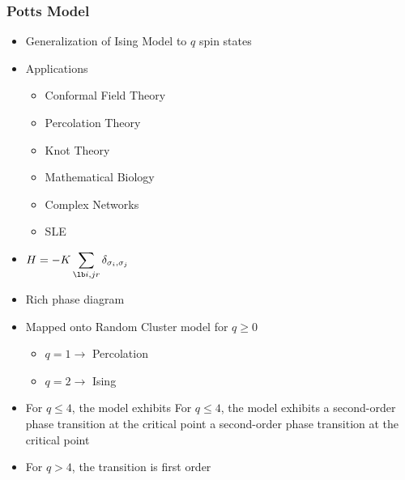 \documentclass[11pt]{article}
\begin{document}
\subsubsection{Potts Model \cite{Wu82}}
\label{sec-5-1-1}
\begin{itemize}

\item Generalization of Ising Model to $q$ spin states\\
\label{sec-5-1-1-1}%
\item Applications
\label{sec-5-1-1-2}%
\begin{itemize}

\item Conformal Field Theory\\
\label{sec-5-1-1-2-1}%
\item Percolation Theory\\
\label{sec-5-1-1-2-2}%
\item Knot Theory\\
\label{sec-5-1-1-2-3}%
\item Mathematical Biology\\
\label{sec-5-1-1-2-4}%
\item Complex Networks\\
\label{sec-5-1-1-2-5}%
\item SLE\\
\label{sec-5-1-1-2-6}%
\end{itemize} %

\item $H=-K \displaystyle\sum_{\lb i,j r} \delta_{\sigma_i, \sigma_j}$\\
\label{sec-5-1-1-3}%
\item Rich phase diagram\\
\label{sec-5-1-1-4}%
\item Mapped onto Random Cluster model for $q \ge 0$
\label{sec-5-1-1-5}%
\begin{itemize}

\item $q = 1 \to$ Percolation\\
\label{sec-5-1-1-5-1}%
\item $q = 2 \to$ Ising\\
\label{sec-5-1-1-5-2}%
\end{itemize} %

\item For $q \le 4$, the model exhibits For $q \le 4$, the model exhibits a second-order phase transition at the critical point a second-order phase transition at the critical point\\
\label{sec-5-1-1-6}%
\item For $q>4$, the transition is first order \cite{Bax}\\
\label{sec-5-1-1-7}%
\end{itemize} %
\end{document}
